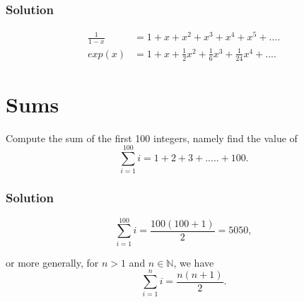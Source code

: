 \documentclass[12pt,a4paper,titlepage]{article}
\begin{document}
\subsubsection*{Solution}
\begin{align*}
\frac{1}{1-x}&=1+x+x^{2}+x^{3}+x^{4}+x^{5}+....\\
exp(x)&=1+x+\frac{1}{2}x^{2}+\frac{1}{6}x^{3}+\frac{1}{24}x^{4}+....
\end{align*}




\section{Sums}

Compute the sum of the first 100 integers, namely find the value of
$$
\sum_{i=1}^{100} i =1 +2 + 3+ .....+100.
$$

\subsubsection*{Solution}

$$
\sum_{i=1}^{100} i = \frac{100(100+1)}{2} =5050,
$$

or more generally, for $n >1$ and $n \in \mathbb{N}$, we have
$$
\sum_{i=1}^{n} i = \frac{n(n+1)}{2}.
$$
\end{document}
